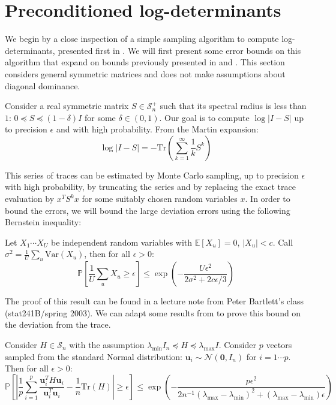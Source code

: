 
\section{Preconditioned log-determinants\label{sec:Preconditioned-log-determinants}}

We begin by a close inspection of a simple sampling algorithm to compute
log-determinants, presented first in \cite{Barry1999}. We will first
present some error bounds on this algorithm that expand on bounds
previously presented in \cite{Bai1996} and \cite{Barry1999}. This
section considers general symmetric matrices and does not make assumptions
about diagonal dominance.

Consider a real symmetric matrix $S\in\mathcal{S}_{n}^{+}$ such that
its spectral radius is less than $1$: $0\preceq S\preceq\left(1-\delta\right)I$
for some $\delta\in\left(0,1\right)$. Our goal is to compute $\log\left|I-S\right|$
up to precision $\epsilon$ and with high probability. From the Martin
expansion: 
\begin{equation}
\log\left|I-S\right|=-\mbox{Tr}\left(\sum_{k=1}^{\infty}\frac{1}{k}S^{k}\right)\label{eq:martin}
\end{equation}


This series of traces can be estimated by Monte Carlo sampling, up
to precision $\epsilon$ with high probability, by truncating the
series and by replacing the exact trace evaluation by $x^{T}S^{k}x$
for some suitably chosen random variables $x$. In order to bound
the errors, we will bound the large deviation errors using the following
Bernstein inequality:

\begin{lemma} \label{lem:bernstein}Let $X_{1}\cdots X_{U}$ be independent
random variables with $\mathbb{E}\left[X_{u}\right]=0$, $\left|X_{u}\right|<c$.
Call $\sigma^{2}=\frac{1}{U}\sum_{u}\text{Var}\left(X_{u}\right)$,
then for all $\epsilon>0$: 
\[
\mathbb{P}\left[\frac{1}{U}\sum_{u}X_{u}\geq\epsilon\right]\leq\exp\left(-\frac{U\epsilon^{2}}{2\sigma^{2}+2c\epsilon/3}\right)
\]


\end{lemma}

The proof of this result can be found in a lecture note from Peter
Bartlett's class (stat241B/spring 2003). We can adapt some results
from \cite{Barry1999} to prove this bound on the deviation from the
trace.

\begin{lemma} \label{lem:bernstein-trace}Consider $H\in\mathcal{S}_{n}$
with the assumption $\lambda_{\text{min}}I_{n}\preceq H\preceq\lambda_{\text{max}}I$.
Consider $p$ vectors sampled from the standard Normal distribution:
$\mathbf{u}_{i}\sim\mathcal{N}\left(\mathbf{0},I_{n}\right)$ for
$i=1\cdots p$. Then for all $\epsilon>0$: 
\[
\mathbb{P}\left[\left|\frac{1}{p}\sum_{i=1}^{p}\frac{\mathbf{u}_{i}^{T}H\mathbf{u}_{i}}{\mathbf{u}_{i}^{T}\mathbf{u}_{i}}-\frac{1}{n}\mbox{Tr}\left(H\right)\right|\geq\epsilon\right]\leq\exp\left(-\frac{p\epsilon^{2}}{2n^{-1}\left(\lambda_{\max}-\lambda_{\min}\right)^{2}+\left(\lambda_{\max}-\lambda_{\min}\right)\epsilon}\right)
\]
\end{lemma} 

